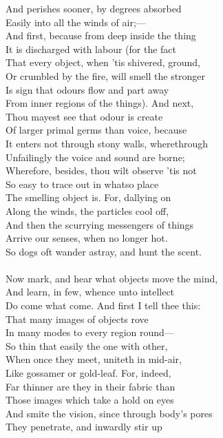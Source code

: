 And perishes sooner, by degrees absorbed\\
Easily into all the winds of air;—\\
And first, because from deep inside the thing\\
It is discharged with labour (for the fact\\
That every object, when 'tis shivered, ground,\\
Or crumbled by the fire, will smell the stronger\\
Is sign that odours flow and part away\\
From inner regions of the things). And next,\\
Thou mayest see that odour is create\\
Of larger primal germs than voice, because\\
It enters not through stony walls, wherethrough\\
Unfailingly the voice and sound are borne;\\
Wherefore, besides, thou wilt observe 'tis not\\
So easy to trace out in whatso place\\
The smelling object is. For, dallying on\\
Along the winds, the particles cool off,\\
And then the scurrying messengers of things\\
Arrive our senses, when no longer hot.\\
So dogs oft wander astray, and hunt the scent.\\
\\
Now mark, and hear what objects move the mind,\\
And learn, in few, whence unto intellect\\
Do come what come. And first I tell thee this:\\
That many images of objects rove\\
In many modes to every region round—\\
So thin that easily the one with other,\\
When once they meet, uniteth in mid-air,\\
Like gossamer or gold-leaf. For, indeed,\\
Far thinner are they in their fabric than\\
Those images which take a hold on eyes\\
And smite the vision, since through body's pores\\
They penetrate, and inwardly stir up\\
